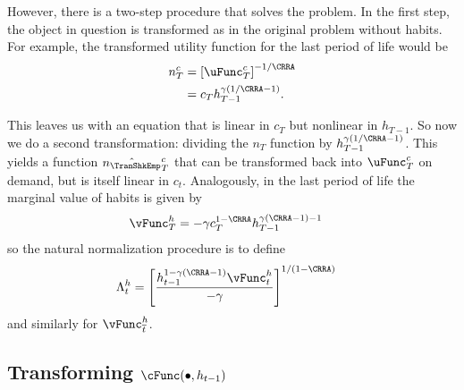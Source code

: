 \documentclass[titlepage, headings=optiontotocandhead]{\econtex}
\begin{document}
{  However, there is a two-step procedure that solves the problem.  In
  the first step, the object in question is transformed as in the
  original problem without habits.  For example, the transformed utility
  function for the last period of life would be
  \begin{equation}\begin{gathered}\begin{aligned}
        n_{T}^{c}  & = \left[\uFunc^{c}_{T}\right]^{-1/\CRRA}
        \\        & = {c}_{T}h_{T-1}^{\gamma(1/\CRRA-1)}.
      \end{aligned}\end{gathered}\end{equation}

  This leaves us with an equation that is linear in ${c}_{T}$ but
  nonlinear in $h_{T-1}$.  So now we do a second transformation:
  dividing the $n_{T}$ function by $h_{T-1}^{\gamma(1/\CRRA-1)}$.  This
  yields a function $\hat{n_{\TranShkEmp}}_{T}^{c}$ that can be transformed back into
  $\uFunc^{c}_{T}$ on demand, but is itself linear in ${c}_{t}.$  Analogously,
  in the last period of life the marginal value of habits is given by
  \begin{equation*}\begin{gathered}\begin{aligned}
        {\vFunc}_{T}^{h}  & = -\gamma {c}_{T}^{1-\CRRA}h_{T-1}^{\gamma(\CRRA-1)-1}
      \end{aligned}\end{gathered}\end{equation*}
  so the natural normalization procedure is to define
  \begin{equation}\begin{gathered}\begin{aligned}
        \Lambda_{t}^{h} 
        & =                           \left[\frac{h_{t-1}^{1-\gamma(\CRRA-1)}{\vFunc}_{t}^{h}}{-\gamma}\right]^{1/(1-\CRRA)}
      \end{aligned}\end{gathered}\end{equation}
  and similarly for $\vEOPt^{h}$.


  \hypertarget{Transforming-cFunc}{}
  \subsection{Transforming $\cFunc(\bullet,h_{t-1})$}

}
\end{document}
